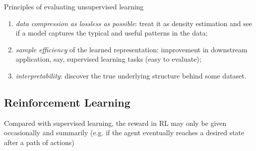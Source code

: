 Principles of evaluating unsupervised learning
\begin{enumerate}
    \item \textit{data compression as lossless as possible}:
    treat it as density estimation
    and see if a model captures the typical and useful patterns in the data;
    \item \textit{sample efficiency} of the learned representation: improvement in downstream application, 
    say, supervised learning tasks (easy to evaluate);
    \item \textit{interpretability}: discover the true underlying structure behind some dataset.
\end{enumerate}

\subsection{Reinforcement Learning}



Compared with supervised learning, the reward in RL may only be given occasionally and summarily
(e.g. if the agent eventually reaches a desired state after a path of actions)

